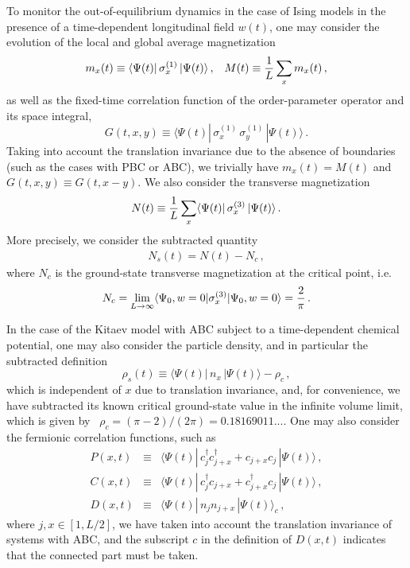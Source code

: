 To monitor the out-of-equilibrium dynamics in the case of Ising models
in the presence of a time-dependent longitudinal field $w(t)$, one may
consider the evolution of the local and global average magnetization
\begin{equation}
  m_x(t) \equiv \langle \Psi(t) | \, \sigma_x^{(1)} \, | \Psi(t)\rangle\,,
  \;\;\; M(t) \equiv {1\over L} \sum_x m_x(t)\,,
  \label{magnt}
\end{equation}
as well as the fixed-time correlation function of the order-parameter
operator and its space integral,
\begin{equation}
  G(t,x,y) \equiv \langle \Psi(t) | \,  \sigma_{x}^{(1)} \, 
  \sigma_{y}^{(1)}\,| \Psi(t)\rangle\,.
  \label{twopointt}
\end{equation}
Taking into account the translation invariance due to the absence of
boundaries (such as the cases with PBC or ABC), we trivially have
$m_x(t) = M(t)$ and $G(t,x,y) \equiv G(t,x-y)$.
We also consider the transverse magnetization 
\begin{equation}
N(t) \equiv {1\over L} \sum_x \langle \Psi(t) | \, \sigma_x^{(3)} \,
| \Psi(t)\rangle\,.
  \label{magntt}
\end{equation}
More precisely, we consider the subtracted quantity
\begin{eqnarray}
  N_s(t) = N(t) - N_c\,,\label{subdef}
\end{eqnarray}
where $N_c$ is the ground-state transverse magnetization at the
critical point, i.e.~\cite{Pfeuty-70}
\begin{eqnarray}  
  N_c = \lim_{L\to\infty}
  \langle \Psi_0, w=0 | \sigma_x^{(3)} | \Psi_0, w=0\rangle =
  {2\over \pi}\,.\label{mzc}
 \end{eqnarray}

In the case of the Kitaev model with ABC subject to a time-dependent
chemical potential, one may also consider the particle density, and in
particular the subtracted definition
\begin{equation}
  \rho_s(t) \equiv \langle \Psi(t) | \,  n_x \, |
  \Psi(t)\rangle - \rho_c\,,
  \label{rhot}
\end{equation}
which is independent of $x$ due to translation invariance, and, for
convenience, we have subtracted its known critical ground-state value
in the infinite volume limit, which is given by~\cite{Pfeuty-70}
$\rho_c = (\pi-2)/(2\pi)=0.18169011...$. One may also consider the
fermionic correlation functions, such as
\begin{eqnarray}
  P(x,t) &\equiv& \langle \Psi(t) | \, c_j^\dagger 
  c_{j+x}^\dagger + c_{j+x} c_{j} \, | \Psi(t)\rangle\, ,
  \label{eq:corr} \\
  C(x,t) & \equiv  &\langle \Psi(t) |
  \, c_j^\dagger c_{j+x} 
  + c_{j+x}^\dagger c_{j} \, | \Psi(t) \rangle \, ,
  \nonumber \\
  D(x,t)& \equiv &
  \langle \Psi(t) | \, n_j n_{j+x} \, |\Psi(t) \rangle_c \,, 
  \nonumber
\end{eqnarray}
where $j,x \in [1,L/2]$, we have taken into account the translation
invariance of systems with ABC, and the subscript $c$ in the definition
of $D(x,t)$ indicates that the connected part must be taken.


